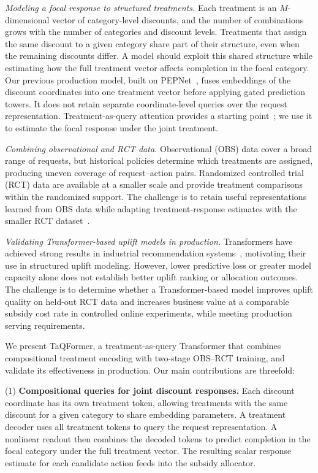 \documentclass[sigconf,nonacm]{acmart}
\newcommand{\model}{TaQFormer\xspace}
\begin{document}
\emph{Modeling a focal response to structured treatments.}
Each treatment is an $M$-dimensional vector of category-level discounts, and the number of combinations grows with the number of categories and discount levels. Treatments that assign the same discount to a given category share part of their structure, even when the remaining discounts differ. A model should exploit this shared structure while estimating how the full treatment vector affects completion in the focal category. Our previous production model, built on PEPNet~\cite{chang2023pepnet}, fuses embeddings of the discount coordinates into one treatment vector before applying gated prediction towers. It does not retain separate coordinate-level queries over the request representation. Treatment-as-query attention provides a starting point~\cite{zhang2023exploring}; we use it to estimate the focal response under the joint treatment.

\emph{Combining observational and RCT data.}
Observational (OBS) data cover a broad range of requests, but historical policies determine which treatments are assigned, producing uneven coverage of request--action pairs. Randomized controlled trial (RCT) data are available at a smaller scale and provide treatment comparisons within the randomized support. The challenge is to retain useful representations learned from OBS data while adapting treatment-response estimates with the smaller RCT dataset~\cite{wu2022integrative,cheng2021adaptive}.

\emph{Validating Transformer-based uplift models in production.}
Transformers have achieved strong results in industrial recommendation systems~\cite{gui2023hiformer,zhang2025onetrans}, motivating their use in structured uplift modeling. However, lower predictive loss or greater model capacity alone does not establish better uplift ranking or allocation outcomes. The challenge is to determine whether a Transformer-based model improves uplift quality on held-out RCT data and increases business value at a comparable subsidy cost rate in controlled online experiments, while meeting production serving requirements.

We present \model, a treatment-as-query Transformer that combines compositional treatment encoding with two-stage OBS--RCT training, and validate its effectiveness in production. Our main contributions are threefold:

(1) \textbf{Compositional queries for joint discount responses.}
Each discount coordinate has its own treatment token, allowing treatments with the same discount for a given category to share embedding parameters. A treatment decoder uses all treatment tokens to query the request representation. A nonlinear readout then combines the decoded tokens to predict completion in the focal category under the full treatment vector. The resulting scalar response estimate for each candidate action feeds into the subsidy allocator.
\end{document}

